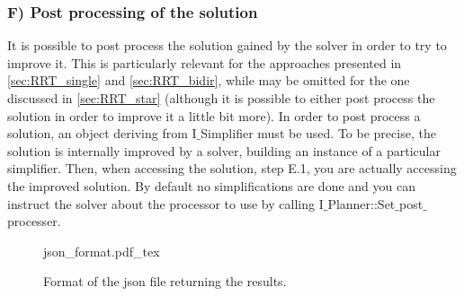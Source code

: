 \subsubsection{F) Post processing of the solution}

It is possible to post process the solution gained by the solver in order to try to improve it. This is particularly relevant for the approaches presented in \ref{sec:RRT_single} and \ref{sec:RRT_bidir}, while may be omitted for the one discussed in \ref{sec:RRT_star} (although it is possible to either post process the solution in order to improve it a little bit more).
In order to post process a solution, an object deriving from I$\_$Simplifier must be used. To be precise, the solution is internally improved by a solver, building an instance of a particular simplifier. Then, when accessing the solution, step E.1, you are actually accessing the improved solution. By default no simplifications are done and you can instruct the solver about the processor to use by calling I$\_$Planner::Set$\_$post$\_$processer.


 \begin{figure}
	 \centering
 \def\svgwidth{0.85 \columnwidth}
 {json_format.pdf_tex} 
	 \caption{Format of the json file returning the results.}
 \label{fig:json_format}
 \end{figure}



